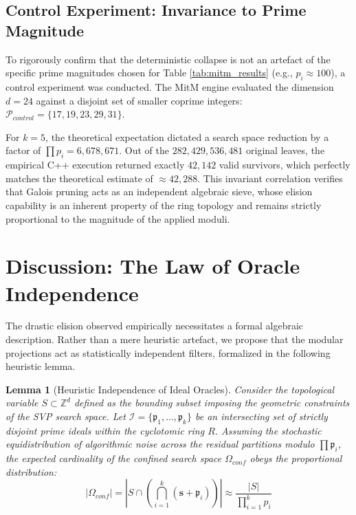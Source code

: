 \documentclass[sn-mathphys, a4paper]{sn-jnl}
\begin{document}
\subsection{Control Experiment: Invariance to Prime Magnitude}

To rigorously confirm that the deterministic collapse is not an artefact of the specific prime magnitudes chosen for Table \ref{tab:mitm_results} (e.g., $p_i \approx 100$), a control experiment was conducted. The MitM engine evaluated the dimension $d=24$ against a disjoint set of smaller coprime integers: $\mathcal{P}_{control} = \{17, 19, 23, 29, 31\}$.

For $k=5$, the theoretical expectation dictated a search space reduction by a factor of $\prod p_i = 6,678,671$. Out of the $282,429,536,481$ original leaves, the empirical C++ execution returned exactly $42,142$ valid survivors, which perfectly matches the theoretical estimate of $\approx 42,288$. This invariant correlation verifies that Galois pruning acts as an independent algebraic sieve, whose elision capability is an inherent property of the ring topology and remains strictly proportional to the magnitude of the applied moduli.

\section{Discussion: The Law of Oracle Independence}

The drastic elision observed empirically necessitates a formal algebraic description. Rather than a mere heuristic artefact, we propose that the modular projections act as statistically independent filters, formalized in the following heuristic lemma.

\newtheorem{lemma}{Lemma}
\begin{lemma}[Heuristic Independence of Ideal Oracles]
Consider the topological variable $S \subset \mathbb{Z}^d$ defined as the bounding subset imposing the geometric constraints of the SVP search space. Let $\mathcal{I} = \{\mathfrak{p}_1, \dots, \mathfrak{p}_k\}$ be an intersecting set of strictly disjoint prime ideals within the cyclotomic ring $R$. Assuming the stochastic equidistribution of algorithmic noise across the residual partitions modulo $\prod \mathfrak{p}_i$, the expected cardinality of the confined search space $\Omega_{conf}$ obeys the proportional distribution:
\begin{equation}
|\Omega_{conf}| = \left| S \cap \left( \bigcap_{i=1}^k (\mathbf{s} + \mathfrak{p}_i) \right) \right| \approx \frac{|S|}{\prod_{i=1}^k p_i}
\end{equation}
\end{lemma}
\end{document}
